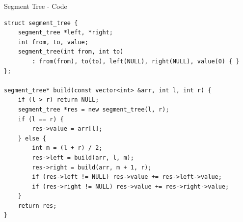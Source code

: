 \documentclass{beamer}
\begin{document}
\begin{frame}{Segment Tree - Code}
    \begin{verbatim}
struct segment_tree {
    segment_tree *left, *right;
    int from, to, value;
    segment_tree(int from, int to)
        : from(from), to(to), left(NULL), right(NULL), value(0) { }
};

segment_tree* build(const vector<int> &arr, int l, int r) {
    if (l > r) return NULL;
    segment_tree *res = new segment_tree(l, r);
    if (l == r) {
        res->value = arr[l];
    } else {
        int m = (l + r) / 2;
        res->left = build(arr, l, m);
        res->right = build(arr, m + 1, r);
        if (res->left != NULL) res->value += res->left->value;
        if (res->right != NULL) res->value += res->right->value;
    }
    return res;
}
    \end{verbatim}
\end{frame}
\end{document}
